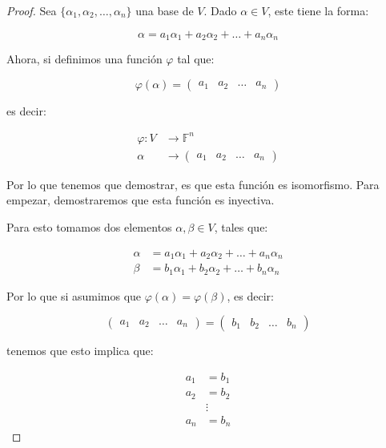 		\begin{proof}
			Sea $\{ \alpha_1, \alpha_2, \dots, \alpha_n \}$ una base de $V$. Dado $\alpha \in V$, este tiene la forma:

			\begin{equation*}
				\alpha = a_1 \alpha_1 + a_2 \alpha_2 + \dots + a_n \alpha_n
			\end{equation*}

			Ahora, si definimos una función $\varphi$ tal que:

			\begin{equation*}
				\varphi(\alpha) =
				\begin{pmatrix}
					a_1 & a_2 & \dots & a_n
				\end{pmatrix}
			\end{equation*}

			es decir:

			\begin{align*}
				\varphi \colon V &\to \mathbb{F}^n \\
				\alpha &\to \begin{pmatrix} a_1 & a_2 & \dots & a_n \end{pmatrix}
			\end{align*}

			Por lo que tenemos que demostrar, es que esta función es isomorfismo.
			Para empezar, demostraremos que esta función es inyectiva.

			Para esto tomamos dos elementos $\alpha, \beta \in V$, tales que:

			\begin{align*}
				\alpha &= a_1 \alpha_1 + a_2 \alpha_2 + \dots + a_n \alpha_n \\
				\beta &= b_1 \alpha_1 + b_2 \alpha_2 + \dots + b_n \alpha_n
			\end{align*}

			Por lo que si asumimos que $\varphi(\alpha) = \varphi(\beta)$, es decir:

			\begin{equation}
				\begin{pmatrix}
					a_1 & a_2 & \dots & a_n
				\end{pmatrix} =
				\begin{pmatrix}
					b_1 & b_2 & \dots & b_n
				\end{pmatrix}
			\end{equation}

			tenemos que esto implica que:

			\begin{align*}
				a_1 &= b_1 \\
				a_2 &= b_2 \\
				&\vdots \\
				a_n &= b_n
			\end{align*}


\end{proof}
